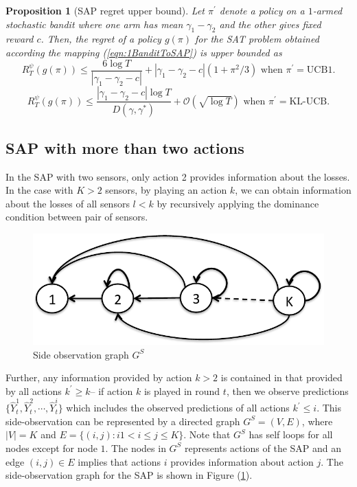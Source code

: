 \documentclass{article}
\newtheorem{proposition}{Proposition}
\begin{document}
\begin{proposition}[SAP regret upper bound]
	Let $\pi^\prime$ denote a policy on a $1$-armed stochastic bandit where one arm has mean $\gamma_1-\gamma_2$ and the other gives fixed reward $c$. Then, the regret of a policy $g(\pi)$ for the SAT problem obtained according the mapping (\ref{eqn:1BanditToSAP}) is upper bounded as
	\begin{equation}
	R^\psi_T(g(\pi))\leq \frac{6\log T}{|\gamma_1-\gamma_2-c|} + |\gamma_1-\gamma_2-c|(1+\pi^2/3) 	\mbox{ when } \pi^\prime=\mbox{UCB1}. 
	\end{equation}
		\begin{equation}
		R^\psi_T(g(\pi))\leq \frac{|\gamma_1-\gamma_2-c|\log T}{D(\hat{\gamma},\gamma^*)} + \mathcal{O}(\sqrt{\log T }) 	\mbox{ when } \pi^\prime=\mbox{KL-UCB}. 
		\end{equation}
\end{proposition}
\subsection{SAP with more than two actions}
In the SAP with two sensors, only action 2 provides information about the losses. In the case with $K>2$ sensors, by playing an action $k$, we can obtain information about the losses of all sensors $l<k$ by recursively applying the dominance condition between pair of sensors. 
\begin{figure}
	\centering
	\includegraphics[scale=.5]{SideInfoGraph.pdf}
	\caption{Side observation graph $G^S$}
	\label{fig:SideObservationGraph]}
\end{figure} 
Further, any information provided by action $k>2$ is contained in that provided by all actions $k^\prime\geq k$-- if action $k$ is played in round $t$, then we observe predictions $\{\hat{Y}_t^1, \hat{Y}_t^2, \cdots, \hat{Y}_t^i\}$ which includes the observed predictions of all actions $k^\prime\leq i$. 
This side-observation can be represented by a directed graph $G^S=(V,E)$, where $|V|=K$ and $E=\{(i,j): i 1<i\leq j\leq K \}$. Note that $G^S$ has self loops for all nodes except for node $1$. The nodes in $G^S$ represents actions of the SAP and an edge $(i,j)\in E$ implies that actions $i$ provides information about action $j$. The side-observation graph for the SAP is shown in Figure (\ref{fig:SideObservationGraph]}).
\end{document}
